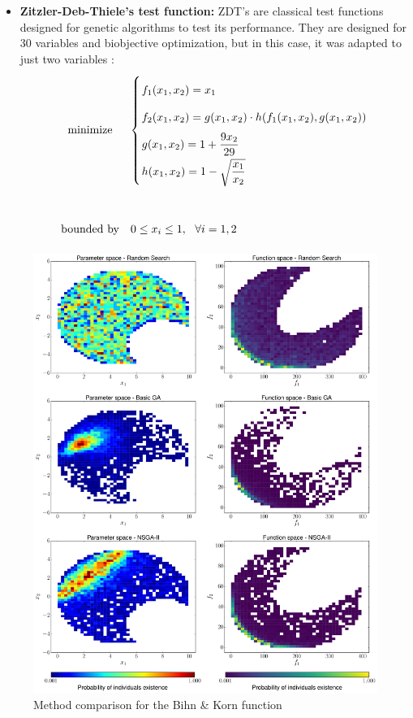 \begin{itemize}
\item \textbf{Zitzler-Deb-Thiele's test function:} ZDT's are classical test functions designed for genetic algorithms to test its performance. They are designed for 30 variables and biobjective optimization, but in this case, it was adapted to just two variables \cite{zitzler2000comparison}:
    \begin{equation}
\begin{array}{cl}
            \textrm{minimize} & 
            \left\{
             \arraycolsep=1.0pt\def\arraystretch{2.0} \begin{array}{l}
            f_1(x_1,x_2) = x_1\\
            f_2(x_1,x_2) = g(x_1,x_2) \cdot h(f_1(x_1,x_2),g(x_1,x_2))\\
            g(x_1,x_2) = 1+\dfrac{9x_2}{29} \\
            h(x_1,x_2) = 1 - \sqrt{\dfrac{x_1}{x_2}}
            \end{array} \right. \\
            & \\
           \textrm{bounded by} & 0 \leq x_i \leq 1, \ \ \forall i = 1,2
        \end{array}
        \label{eq:ZDT2}
    \end{equation}
\end{itemize}

\newpage

    \begin{figure}[H]
        \centering
        \includegraphics[height=0.96\textheight, width=\textwidth]{Figures/3/hist_BK.pdf}
        \caption{Method comparison for the Bihn \& Korn function}
        \label{fig:histogramBK}
    \end{figure}
    
